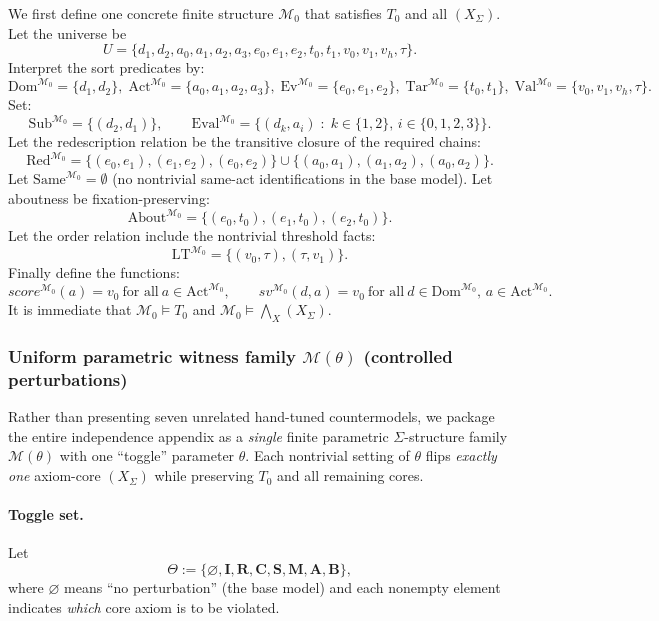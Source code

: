 \documentclass[12pt]{article}
\begin{document}
We first define one concrete finite structure $\mathcal{M}_0$ that satisfies $T_0$ and all $(X_\Sigma)$.
Let the universe be
\[
U=\{d_1,d_2,a_0,a_1,a_2,a_3,e_0,e_1,e_2,t_0,t_1,v_0,v_1,v_h,\tau\}.
\]
Interpret the sort predicates by:
\[
\mathrm{Dom}^{\mathcal{M}_0}=\{d_1,d_2\},\;
\mathrm{Act}^{\mathcal{M}_0}=\{a_0,a_1,a_2,a_3\},\;
\mathrm{Ev}^{\mathcal{M}_0}=\{e_0,e_1,e_2\},\;
\mathrm{Tar}^{\mathcal{M}_0}=\{t_0,t_1\},\;
\mathrm{Val}^{\mathcal{M}_0}=\{v_0,v_1,v_h,\tau\}.
\]
Set:
\[
\mathrm{Sub}^{\mathcal{M}_0}=\{(d_2,d_1)\},\qquad
\mathrm{Eval}^{\mathcal{M}_0}=\{(d_k,a_i)\;:\;k\in\{1,2\},\, i\in\{0,1,2,3\}\}.
\]
Let the redescription relation be the transitive closure of the required chains:
\[
\mathrm{Red}^{\mathcal{M}_0}=\{(e_0,e_1),(e_1,e_2),(e_0,e_2)\}\cup\{(a_0,a_1),(a_1,a_2),(a_0,a_2)\}.
\]
Let $\mathrm{Same}^{\mathcal{M}_0}=\emptyset$ (no nontrivial same-act identifications in the base model).
Let aboutness be fixation-preserving:
\[
\mathrm{About}^{\mathcal{M}_0}=\{(e_0,t_0),(e_1,t_0),(e_2,t_0)\}.
\]
Let the order relation include the nontrivial threshold facts:
\[
\mathrm{LT}^{\mathcal{M}_0}=\{(v_0,\tau),(\tau,v_1)\}.
\]
Finally define the functions:
\[
score^{\mathcal{M}_0}(a)=v_0\ \text{for all}\ a\in \mathrm{Act}^{\mathcal{M}_0},\qquad
sv^{\mathcal{M}_0}(d,a)=v_0\ \text{for all}\ d\in \mathrm{Dom}^{\mathcal{M}_0},\, a\in \mathrm{Act}^{\mathcal{M}_0}.
\]
It is immediate that $\mathcal{M}_0\models T_0$ and $\mathcal{M}_0\models \bigwedge_X (X_\Sigma)$.

\subsubsection{Uniform parametric witness family \texorpdfstring{$\mathcal{M}(\theta)$}{M(theta)} (controlled perturbations)}
\label{app:paramfam}

Rather than presenting seven unrelated hand-tuned countermodels, we package the entire independence appendix as a \emph{single} finite parametric
$\Sigma$-structure family $\mathcal{M}(\theta)$ with one ``toggle'' parameter $\theta$.
Each nontrivial setting of $\theta$ flips \emph{exactly one} axiom-core $(X_\Sigma)$ while preserving $T_0$ and all remaining cores.

\paragraph{Toggle set.}
Let
\[
\Theta:=\{\varnothing,\mathbf{I},\mathbf{R},\mathbf{C},\mathbf{S},\mathbf{M},\mathbf{A},\mathbf{B}\},
\]
where $\varnothing$ means ``no perturbation'' (the base model) and each nonempty element indicates \emph{which} core axiom is to be violated.
\end{document}
